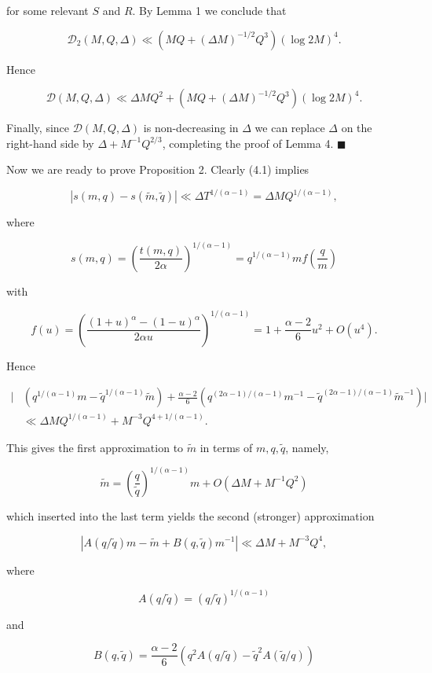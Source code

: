 \documentclass[10pt]{article}
\newcommand{\proofend}{\hfill\(\blacksquare\)}
\begin{document}
for some relevant $S$ and $R$. By Lemma 1 we conclude that

$$
\mathscr{D}_{2}(M, Q, \Delta) \ll\left(M Q+(\Delta M)^{-1 / 2} Q^{3}\right)(\log 2 M)^{4} .
$$

Hence

$$
\mathscr{D}(M, Q, \Delta) \ll \Delta M Q^{2}+\left(M Q+(\Delta M)^{-1 / 2} Q^{3}\right)(\log 2 M)^{4} .
$$

Finally, since $\mathscr{D}(M, Q, \Delta)$ is non-decreasing in $\Delta$ we can replace $\Delta$ on the right-hand side by $\Delta+M^{-1} Q^{2 / 3}$, completing the proof of Lemma 4. \proofend

Now we are ready to prove Proposition 2. Clearly (4.1) implies

$$
|s(m, q)-s(\tilde{m}, \tilde{q})| \ll \Delta T^{1 /(\alpha-1)}=\Delta M Q^{1 /(\alpha-1)},
$$

where

$$
s(m, q)=\left(\frac{t(m, q)}{2 \alpha}\right)^{1 /(\alpha-1)}=q^{1 /(\alpha-1)} m f\left(\frac{q}{m}\right)
$$

with

$$
f(u)=\left(\frac{(1+u)^{\alpha}-(1-u)^{\alpha}}{2 \alpha u}\right)^{1 /(\alpha-1)}=1+\frac{\alpha-2}{6} u^{2}+O\left(u^{4}\right) .
$$

Hence

$$
\begin{aligned}
\Bigg|&\left(q^{1/(\alpha-1)}m-\tilde q^{1/(\alpha-1)}\tilde m\right)
+\frac{\alpha-2}{6}\left(q^{(2\alpha-1)/(\alpha-1)}m^{-1}
-\tilde q^{(2\alpha-1)/(\alpha-1)}\tilde m^{-1}\right)\Bigg|\\
&\ll \Delta M Q^{1/(\alpha-1)}+M^{-3}Q^{4+1/(\alpha-1)}.
\end{aligned}
$$

This gives the first approximation to $\tilde{m}$ in terms of $m, q, \tilde{q}$, namely,

$$
\tilde{m}=\left(\frac{q}{\tilde{q}}\right)^{1 /(\alpha-1)} m+O\left(\Delta M+M^{-1} Q^{2}\right)
$$

which inserted into the last term yields the second (stronger) approximation

$$
\left|A(q / \tilde{q}) m-\tilde{m}+B(q, \tilde{q}) m^{-1}\right| \ll \Delta M+M^{-3} Q^{4},
$$

where

$$
A(q / \tilde{q})=(q / \tilde{q})^{1 /(\alpha-1)}
$$

and

$$
B(q, \tilde{q})=\frac{\alpha-2}{6}\left(q^{2} A(q / \tilde{q})-\tilde{q}^{2} A(\tilde{q} / q)\right)
$$
\end{document}
